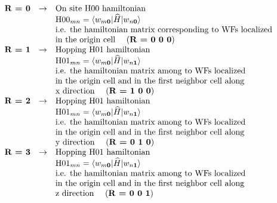 {$\begin{array}{lll}
\textbf{R = 0}   & \rightarrow &  \textrm{On site H00 hamiltonian} \\
\textrm{}       & \textrm{}   &  \textrm{H00}_{mn}=\langle w_{m{\bf 0}} |\widehat{H} | w_{n{\bf 0}}\rangle\\
\textrm{}       & \textrm{}   &  \textrm{i.e. the hamiltonian matrix corresponding to WFs localized}\\
\textrm{}       & \textrm{}   &  \textrm{in the origin cell }\quad (\textbf{R = 0 0 0})\\
\textbf{R = 1}   & \rightarrow &  \textrm{Hopping H01 hamiltonian} \\
\textrm{}       & \textrm{}   &  \textrm{H01}_{mn}=\langle w_{m{\bf 0}} |\widehat{H} | w_{n{\bf 1}}\rangle\\
\textrm{}       & \textrm{}   &  \textrm{i.e. the hamiltonian matrix among to WFs localized}\\
\textrm{}       & \textrm{}   &  \textrm{in the origin cell and in the first neighbor cell along}\\
\textrm{}       & \textrm{}   &  \textrm{x direction }\quad (\textbf{R = 1 0 0})\\
\textbf{R = 2}   & \rightarrow &  \textrm{Hopping H01 hamiltonian} \\
\textrm{}       & \textrm{}   &  \textrm{H01}_{mn}=\langle w_{m{\bf 0}} |\widehat{H} | w_{n{\bf 1}}\rangle\\
\textrm{}       & \textrm{}   &  \textrm{i.e. the hamiltonian matrix among to WFs localized}\\
\textrm{}       & \textrm{}   &  \textrm{in the origin cell and in the first neighbor cell along}\\
\textrm{}       & \textrm{}   &  \textrm{y direction }\quad (\textbf{R = 0 1 0})\\
\textbf{R = 3}   & \rightarrow &  \textrm{Hopping H01 hamiltonian} \\
\textrm{}       & \textrm{}   &  \textrm{H01}_{mn}=\langle w_{m{\bf 0}} |\widehat{H} | w_{n{\bf 1}}\rangle\\
\textrm{}       & \textrm{}   &  \textrm{i.e. the hamiltonian matrix among to WFs localized}\\
\textrm{}       & \textrm{}   &  \textrm{in the origin cell and in the first neighbor cell along}\\
\textrm{}       & \textrm{}   &  \textrm{z direction }\quad (\textbf{R = 0 0 1})
\end{array}$ \par
}

